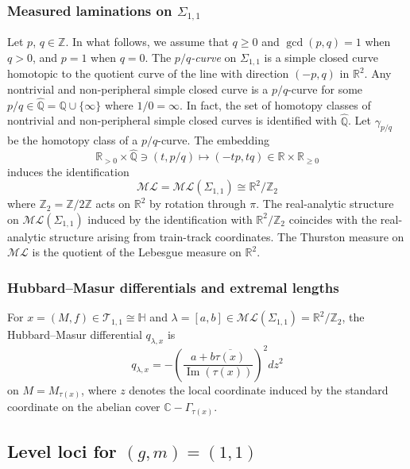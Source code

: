 \documentclass[dvipdfmx]{amsart}
\theoremstyle{remark}
\newcommand{\teich}{\mathcal{T}}
\newcommand{\ml}{\mathcal{ML}}
\begin{document}
\subsubsection{Measured laminations on $\Sigma_{1,1}$}
\label{subsubsec:ML11}
Let $p$, $q\in \mathbb{Z}$. In what follows, we assume that $q\ge 0$ and $\operatorname{gcd}(p,q)=1$ when $q>0$, and $p=1$ when $q=0$.
The \emph{$p/q$-curve} on $\Sigma_{1,1}$ is a simple closed curve homotopic to the quotient curve of the line with direction $(-p,q)$ in $\mathbb{R}^2$. Any nontrivial and non-peripheral simple closed curve is a $p/q$-curve for some $p/q\in \hat{\mathbb{Q}}=\mathbb{Q}\cup\{\infty\}$ where $1/0=\infty$.
In fact, the set of homotopy classes of nontrivial and non-peripheral simple closed curves is identified with $\hat{\mathbb{Q}}$.
Let $\gamma_{p/q}$ be the homotopy class of a $p/q$-curve.
The embedding
\[
\mathbb{R}_{>0}\times \hat{\mathbb{Q}}\ni (t,p/q)\mapsto (-tp,tq)\in \mathbb{R}\times \mathbb{R}_{\ge 0}
\]
induces the identification 
\begin{equation}
\label{eq:ml-coordinates11}
\ml=\ml(\Sigma_{1,1})\cong \mathbb{R}^2/\mathbb{Z}_2
\end{equation}
where $\mathbb{Z}_2=\mathbb{Z}/2\mathbb{Z}$ acts on $\mathbb{R}^2$ by rotation through $\pi$.
The real-analytic structure on $\ml(\Sigma_{1,1})$ induced by the identification with $\mathbb{R}^2/\mathbb{Z}_2$ coincides with the real-analytic structure arising from train-track coordinates.
The Thurston measure on $\ml$ is the quotient of the Lebesgue measure on $\mathbb{R}^2$.

\subsubsection{Hubbard--Masur differentials and extremal lengths}
\label{subsubsec:Extremal-length11}
For $x=(M,f)\in \teich_{1,1}\cong \mathbb{H}$ and $\lambda=[a,b]\in \ml(\Sigma_{1,1})=\mathbb{R}^2/\mathbb{Z}_2$, the Hubbard--Masur differential $q_{\lambda,x}$ is
\begin{equation}
\label{eq:Hubbard-Masur-differential11}
q_{\lambda,x}=-\left(\frac{a+b\overline{\tau(x)}}{\operatorname{Im}(\tau(x))}\right)^2dz^2
\end{equation}
on $M=M_{\tau(x)}$, where $z$ denotes the local coordinate induced by the standard coordinate on the abelian cover $\mathbb{C}-\Gamma_
{\tau(x)}$. 

\subsection{Level loci for $(g,m)=(1,1)$}
\end{document}
